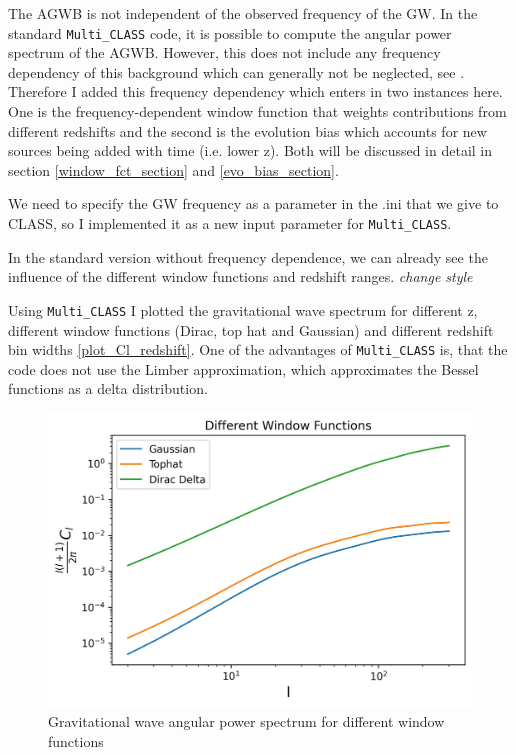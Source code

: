 The AGWB is not independent of the observed frequency of the GW. In the standard 
{\tt Multi\_CLASS} code, it is possible to compute the angular power spectrum of the AGWB. However, this does not include any frequency dependency of this background which can generally not be neglected, see \cite{dallarmi_dipole_2022}. Therefore I added this frequency dependency which enters in two instances here. One is the frequency-dependent window function that weights contributions from different redshifts and the second is the evolution bias which accounts for new sources being added with time (i.e. lower z). Both will be discussed in detail in section \ref{window_fct_section} and \ref{evo_bias_section}.

We need to specify the GW frequency as a parameter in the .ini that we give to CLASS,
so I implemented it as a new input parameter for {\tt Multi\_CLASS}.

In the standard version without frequency dependence, we can already see the influence of the different window functions and redshift ranges.
\textit{change style}

Using {\tt Multi\_CLASS} \cite{bellomo_beware_2020} I plotted the gravitational wave spectrum for different z, 
different window functions (Dirac, top hat and Gaussian) and different redshift bin 
widths \ref{plot_Cl_redshift}. One of the advantages of {\tt Multi\_CLASS} is, that the 
code does not use the Limber approximation, which approximates the Bessel functions 
as a delta distribution. 
\\
\begin{figure}[h]
 \centering
 \includegraphics[width=0.7\linewidth]{Images/GW_autocorr_window-fct.jpg}
 \caption{Gravitational wave angular power spectrum for different window functions}
 \label{plot_Cl_window_fct}
\end{figure} 

